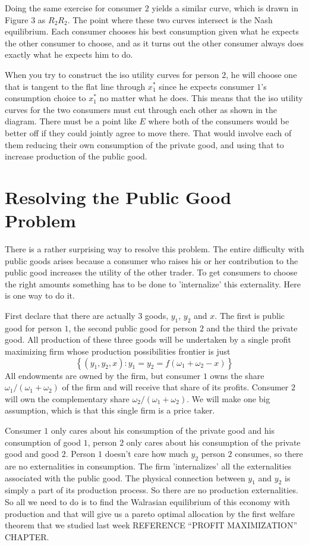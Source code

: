\documentclass{article}
\begin{document}
Doing the same exercise for consumer $2$ yields a similar curve, which is
drawn in Figure $3$ as $R_{2}R_{2}$. The point where these two curves
intersect is the Nash equilibrium. Each consumer chooses his best consumption
given what he expects the other consumer to choose, and as it turns out the
other consumer always does exactly what he expects him to do.

When you try to construct the iso utility curves for person $2$, he will
choose one that is tangent to the flat line through $x_{1}^{\ast}$ since he
expects consumer $1$'s consumption choice to $x_{1}^{\ast}$ no matter what he
does. This means that the iso utility curves for the two consumers must cut
through each other as shown in the diagram. There must be a point like $E$
where both of the consumers would be better off if they could jointly agree to
move there. That would involve each of them reducing their own consumption of
the private good, and using that to increase production of the public good.

\section{Resolving the Public Good Problem}

There is a rather surprising way to resolve this problem. The entire
difficulty with public goods arises because a consumer who raises his or her
contribution to the public good increases the utility of the other trader. To
get consumers to choose the right amounts something has to be done to
'internalize' this externality. Here is one way to do it.

First declare that there are actually 3 goods, $y_{1}$, $y_{2}$ and $x$. The
first is public good for person $1$, the second public good for person $2$ and
the third the private good. All production of these three goods will be
undertaken by a single profit maximizing firm whose production possibilities
frontier is just%
\[
\left\{  \left(  y_{1},y_{2},x\right)  :y_{1}=y_{2}=f\left(  \omega_{1}%
+\omega_{2}-x\right)  \right\}
\]
All endowments are owned by the firm, but consumer $1$ owns the share
$\omega_{1}/\left(  \omega_{1}+\omega_{2}\right)  $ of the firm and will
receive that share of its profits. Consumer $2$ will own the complementary
share $\omega_{2}/\left(  \omega_{1}+\omega_{2}\right)  $. We will make one
big assumption, which is that this single firm is a price taker.

Consumer $1$ only cares about his consumption of the private good and his
consumption of good $1$, person $2$ only cares about his consumption of the
private good and good $2$. Person $1$ doesn't care how much $y_{2}$ person $2$
consumes, so there are no externalities in consumption. The firm
'internalizes' all the externalities associated with the public good. The
physical connection between $y_{1}$ and $y_{2}$ is simply a part of its
production process. So there are no production externalities. So all we need
to do is to find the Walrasian equilibrium of this economy with production and
that will give us a pareto optimal allocation by the first welfare theorem
that we studied last week 	REFERENCE ``PROFIT MAXIMIZATION'' CHAPTER.
\end{document}

